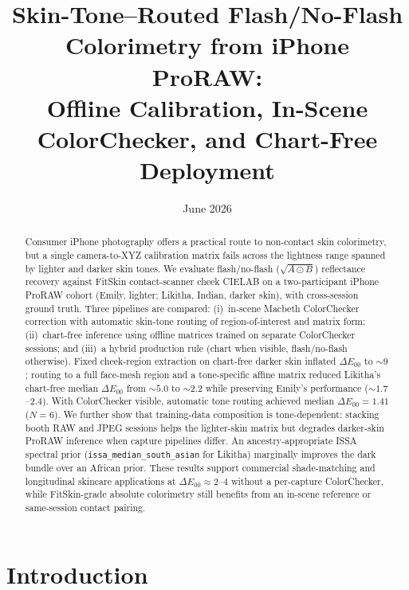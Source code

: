 \documentclass[11pt]{article}
\title{Skin-Tone--Routed Flash/No-Flash Colorimetry from iPhone ProRAW:\\
  Offline Calibration, In-Scene ColorChecker, and Chart-Free Deployment}
\author{%
}
\date{June 2026}
\newcommand{\deee}{\ensuremath{\Delta E_{00}}}
\begin{document}
\maketitle

\begin{abstract}
Consumer iPhone photography offers a practical route to non-contact skin colorimetry, but a single camera-to-XYZ calibration matrix fails across the lightness range spanned by lighter and darker skin tones.
We evaluate flash/no-flash ($\sqrt{A\odot B}$) reflectance recovery against FitSkin contact-scanner cheek CIELAB on a two-participant iPhone ProRAW cohort (Emily, lighter; Likitha, Indian, darker skin), with cross-session ground truth.
Three pipelines are compared: (i)~in-scene Macbeth ColorChecker correction with automatic skin-tone routing of region-of-interest and matrix form; (ii)~chart-free inference using offline matrices trained on separate ColorChecker sessions; and (iii)~a hybrid production rule (chart when visible, flash/no-flash otherwise).
Fixed cheek-region extraction on chart-free darker skin inflated $\deee$ to ${\sim}9$; routing to a full face-mesh region and a tone-specific affine matrix reduced Likitha's chart-free median $\deee$ from ${\sim}5.0$ to ${\sim}2.2$ while preserving Emily's performance (${\sim}1.7$--$2.4$).
With ColorChecker visible, automatic tone routing achieved median $\deee=1.41$ ($N=6$).
We further show that training-data composition is tone-dependent: stacking booth RAW and JPEG sessions helps the lighter-skin matrix but degrades darker-skin ProRAW inference when capture pipelines differ.
An ancestry-appropriate ISSA spectral prior (\texttt{issa\_median\_south\_asian} for Likitha) marginally improves the dark bundle over an African prior.
These results support commercial shade-matching and longitudinal skincare applications at $\deee\approx 2$--$4$ without a per-capture ColorChecker, while FitSkin-grade absolute colorimetry still benefits from an in-scene reference or same-session contact pairing.
\end{abstract}

\section{Introduction}\label{sec:intro}
\end{document}
